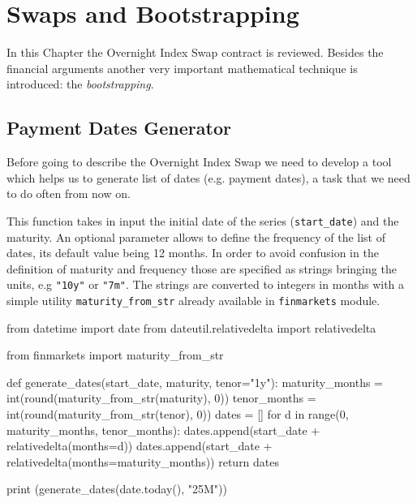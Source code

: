 \chapter{Swaps and Bootstrapping}\label{sec:swaps-and-bootstrapping}

In this Chapter the Overnight Index Swap contract is reviewed. Besides the financial arguments another very important mathematical technique is introduced: the \emph{bootstrapping}.

\section{Payment Dates Generator}
Before going to describe the Overnight Index Swap we need to develop a tool which helps us to generate list of dates (e.g. payment dates), a task that we need to do often from now on. 

\begin{finmarkets}
This function takes in input the initial date of the series (\texttt{start\_date}) and the maturity. An optional parameter allows to define the frequency of the list of dates, its default value being 12 months.
In order to avoid confusion in the definition of maturity and frequency those are specified as strings bringing the units, e.g \texttt{"10y"} or \texttt{"7m"}.
The strings are converted to integers in months with a simple utility \texttt{maturity\_from\_str} already available in \texttt{finmarkets} module.
\end{finmarkets}

\begin{ipython}
from datetime import date
from dateutil.relativedelta import relativedelta

from finmarkets import maturity_from_str

def generate_dates(start_date, maturity, tenor="1y"):
    maturity_months = int(round(maturity_from_str(maturity), 0))
    tenor_months = int(round(maturity_from_str(tenor), 0))
    dates = []
    for d in range(0, maturity_months, tenor_months):
        dates.append(start_date + relativedelta(months=d))
    dates.append(start_date + relativedelta(months=maturity_months))
    return dates

print (generate_dates(date.today(), "25M"))
\end{ipython}
\begin{ioutput}
\end{ioutput}

